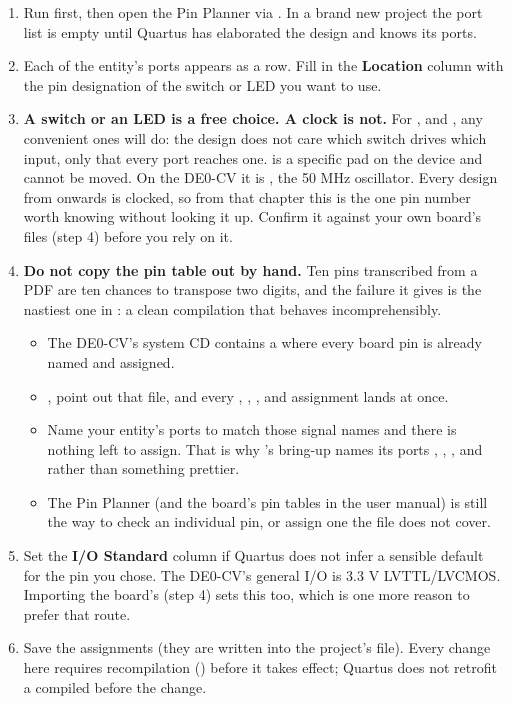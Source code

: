 \begin{enumerate}
  \item Run  first, then open the Pin
    Planner via . In a brand new project the port list is empty until
    Quartus has elaborated the design and knows its ports.
  \item Each of the entity's ports appears as a row. Fill in the \textbf{Location} column with the pin
    designation of the switch or LED you want to use.
  \item \textbf{A switch or an LED is a free choice. A clock is not.} For ,  and
    , any convenient ones will do: the design does not care which switch drives which
    input, only that every port reaches one.  is a specific pad on the device and
    cannot be moved. On the DE0-CV it is \textbf{}, the 50 MHz oscillator. Every design
    from  onwards is clocked, so from that chapter this is the one pin number worth
    knowing without looking it up. Confirm it against your own board's files (step 4) before you rely
    on it.
  \item \textbf{Do not copy the pin table out by hand.} Ten  pins transcribed from a PDF
    are ten chances to transpose two digits, and the failure it gives is the nastiest one in
    : a clean compilation that behaves incomprehensibly.
    \begin{itemize}
      \item The DE0-CV's system CD contains a  where every board pin is already named
        and assigned.
      \item {}, point out that file, and every
        , , ,  and  assignment
        lands at once.
      \item Name your entity's ports to match those signal names and there is nothing left to assign.
        That is why 's bring-up names its ports , ,
        ,  and  rather than something prettier.
      \item The Pin Planner (and the board's pin tables in the user manual) is still the way to check
        an individual pin, or assign one the  file does not cover.
    \end{itemize}
  \item Set the \textbf{I/O Standard} column if Quartus does not infer a sensible default for the pin
    you chose. The DE0-CV's general I/O is 3.3 V LVTTL/LVCMOS. Importing the board's  (step
    4) sets this too, which is one more reason to prefer that route.
  \item Save the assignments (they are written into the project's  file). Every change here
    requires recompilation () before it takes effect; Quartus does not
    retrofit a  compiled before the change.
\end{enumerate}

